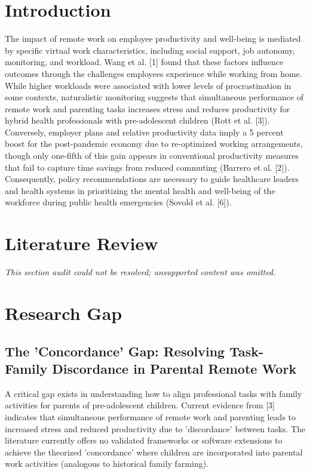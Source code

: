 \documentclass[11pt]{article}
\begin{document}
\section{Introduction}
The impact of remote work on employee productivity and well-being is mediated by specific virtual work characteristics, including social support, job autonomy, monitoring, and workload. Wang et al. [1] found that these factors influence outcomes through the challenges employees experience while working from home. While higher workloads were associated with lower levels of procrastination in some contexts, naturalistic monitoring suggests that simultaneous performance of remote work and parenting tasks increases stress and reduces productivity for hybrid health professionals with pre-adolescent children (Rott et al. [3]). Conversely, employer plans and relative productivity data imply a 5 percent boost for the post-pandemic economy due to re-optimized working arrangements, though only one-fifth of this gain appears in conventional productivity measures that fail to capture time savings from reduced commuting (Barrero et al. [2]). Consequently, policy recommendations are necessary to guide healthcare leaders and health systems in prioritizing the mental health and well-being of the workforce during public health emergencies (Sovold et al. [6]).

\section{Literature Review}
\textit{This section audit could not be resolved; unsupported content was omitted.}

\section{Research Gap}
\subsection{The 'Concordance' Gap: Resolving Task-Family Discordance in Parental Remote Work}
A critical gap exists in understanding how to align professional tasks with family activities for parents of pre-adolescent children. Current evidence from [3] indicates that simultaneous performance of remote work and parenting leads to increased stress and reduced productivity due to 'discordance' between tasks. The literature currently offers no validated frameworks or software extensions to achieve the theorized 'concordance' where children are incorporated into parental work activities (analogous to historical family farming).
\end{document}
